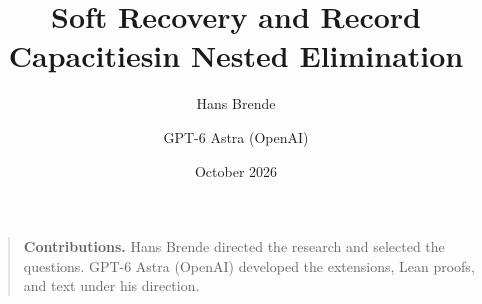 \documentclass[11pt]{article}
\title{Soft Recovery and Record Capacities\newline in Nested Elimination}
\author{Hans Brende \and GPT-6 Astra (OpenAI)}
\date{October 2026}
\numberwithin{equation}{section}
\begin{document}
\maketitle

\begin{quote}\small
\textbf{Contributions.} Hans Brende directed the research and selected the
questions. GPT-6 Astra (OpenAI) developed the extensions, Lean proofs, and
text under his direction.
\end{quote}
\tableofcontents
\clearpage







\appendix




\end{document}
